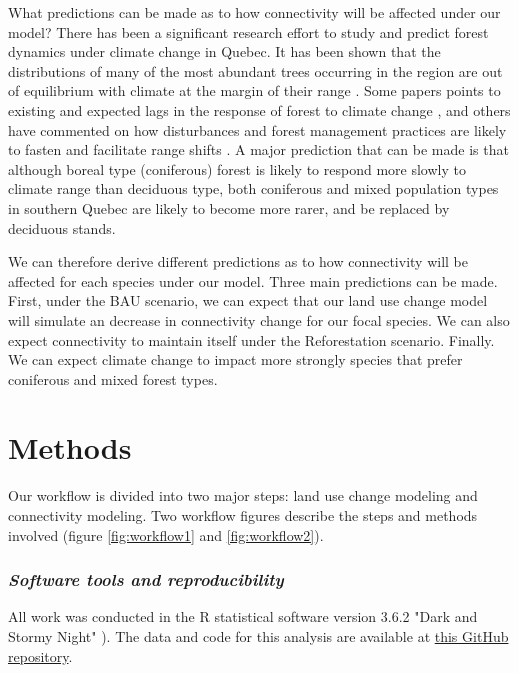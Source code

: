 What predictions can be made as to how connectivity will be affected under our model? There has been a significant research effort to study and predict forest dynamics under climate change in Quebec. It has been shown that the distributions of many of the most abundant trees occurring in the region are out of equilibrium with climate at the margin of their range \citep{talluto_extinction_2017}. Some papers points to existing and expected lags in the response of forest to climate change \citep{savage_elevational_2015,}, and others have commented on how disturbances and forest management practices are likely to fasten and facilitate range shifts \citep{leithead_northward_2010, boulanger_climate_2019, vieira_paying_2020}. A major prediction that can be made is that although boreal type (coniferous) forest is likely to respond more slowly to climate range than deciduous type, both coniferous and mixed population types in southern Quebec are likely to become more rarer, and be replaced by deciduous stands.

We can therefore derive different predictions as to how connectivity will be affected for each species under our model. Three main predictions can be made. First, under the BAU scenario, we can expect that our land use change model will simulate an decrease in connectivity change for our focal species. We can also expect connectivity to maintain itself under the Reforestation scenario. Finally. We can expect climate change to impact more strongly species that prefer coniferous  and mixed forest types. \\

\section{Methods}

Our workflow is divided into two major steps: land use change modeling and connectivity modeling. Two workflow figures describe the steps and methods involved (figure \ref{fig:workflow1} and \ref{fig:workflow2}). \\

\subsubsection*{\textit{Software tools and reproducibility}}

All work was conducted in the R statistical software version 3.6.2 "Dark and Stormy Night" \citep[see][]{R}). The data and code for this analysis are available at \href{https://github.com/VLucet/landchange-connectivity-Montérégie}{this GitHub repository}.

